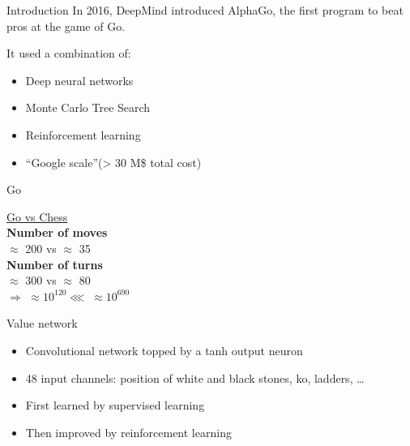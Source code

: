 \begin{frame}{Introduction}
  In 2016, DeepMind introduced AlphaGo, the first program to beat pros at the game of Go.

  It used a combination of:

  \begin{itemize}[<+(1)->]
  \item Deep neural networks
  \item Monte Carlo Tree Search
  \item Reinforcement learning
  \item “Google scale”(> 30 M\$ total cost)
  \end{itemize}
\end{frame}

\begin{frame}{Go}
  \begin{minipage}[c]{0.6\linewidth}
  \end{minipage}\hfill
  \begin{minipage}[c]{0.33\linewidth}
    \begin{center}
      \underline{Go vs Chess} \\
      \textbf{Number of moves} \\
      $\approx$ 200 vs $\approx$ 35 \\
      \textbf{Number of turns} \\
      $\approx$ 300 vs $\approx$ 80 \\
      $\Rightarrow$ $\approx 10^{120}\lll \;\approx 10^{690}$
    \end{center}
  \end{minipage}\hfill
\end{frame}

\begin{frame}{Value network}
  \begin{minipage}[c]{0.68\linewidth}
    \begin{itemize}[<+->]
      \item Convolutional network topped by a tanh output neuron
      \item 48 input channels: position of white and black stones, ko, ladders, …
      \item First learned by supervised learning
      \item Then improved by reinforcement learning
    \end{itemize}
  \end{minipage}\hfill
  \begin{minipage}[c]{0.31\linewidth}
  \end{minipage}\hfill
\end{frame}

